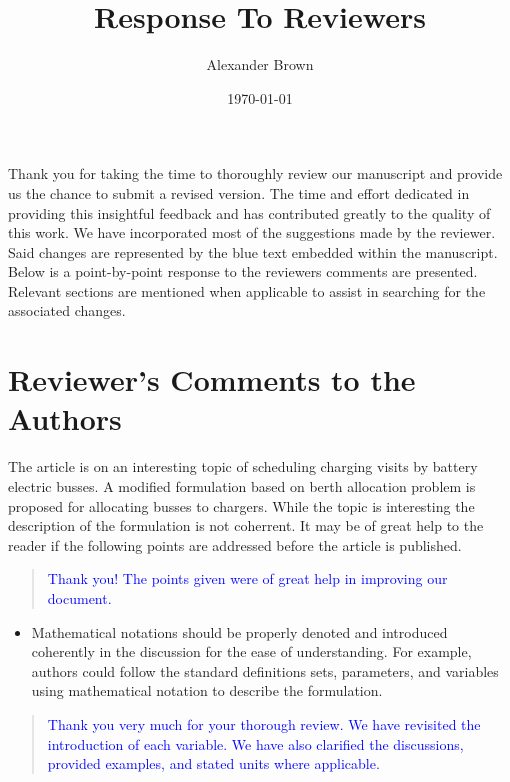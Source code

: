 \documentclass[11pt,a4paper,final]{article}
\author{Alexander Brown}
\date{\today}
\title{Response To Reviewers}
\begin{document}
\maketitle
\tableofcontents

Thank you for taking the time to thoroughly review our manuscript and provide us the chance to submit a revised version. The time and effort dedicated in providing this insightful feedback and has contributed greatly to the quality of this work. We have incorporated most of the suggestions made by the reviewer. Said changes are represented by the blue text embedded within the manuscript. Below is a point-by-point response to the reviewers comments are presented. Relevant sections are mentioned when applicable to assist in searching for the associated changes.

\section{Reviewer's Comments to the Authors}
\label{sec:org45353b3}

The article is on an interesting topic of scheduling charging visits by battery electric busses. A modified formulation
based on berth allocation problem is proposed for allocating busses to chargers. While the topic is interesting the
description of the formulation is not coherrent. It may be of great help to the reader if the following points are
addressed before the article is published.

\begin{quote}
  \textcolor{blue}{Thank you! The points given were of great help in improving our document.}
\end{quote}

\begin{itemize}
\item Mathematical notations should be properly denoted and introduced coherently in the discussion for the ease of understanding. For example, authors could follow the standard definitions sets, parameters, and variables using mathematical notation to describe the formulation.
\end{itemize}

\begin{quote}
  \textcolor{blue}{Thank you very much for your thorough review. We have revisited the introduction of each variable. We have also clarified the discussions, provided examples, and stated units where applicable.}
\end{quote}
\end{document}
